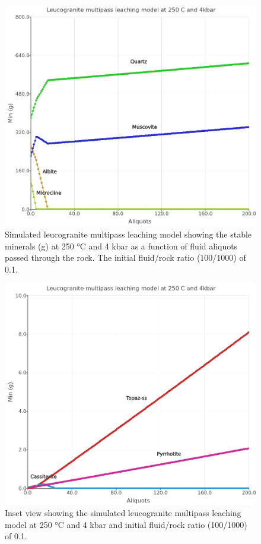 \documentclass[
]{book}
\begin{document}
\begin{figure}
\includegraphics[width=1\linewidth]{figures/module4/fig-12} \caption{Simulated leucogranite multipass leaching model showing the stable minerals (g) at 250 °C and 4 kbar as a function of fluid aliquots passed through the rock. The initial fluid/rock ratio (100/1000) of 0.1.}\label{fig:fig-12d}
\end{figure}

\begin{figure}
\includegraphics[width=1\linewidth]{figures/module4/fig-13} \caption{Inset view showing the simulated leucogranite multipass leaching model at 250 °C and 4 kbar and initial fluid/rock ratio (100/1000) of 0.1.}\label{fig:fig-13d}
\end{figure}
\end{document}
